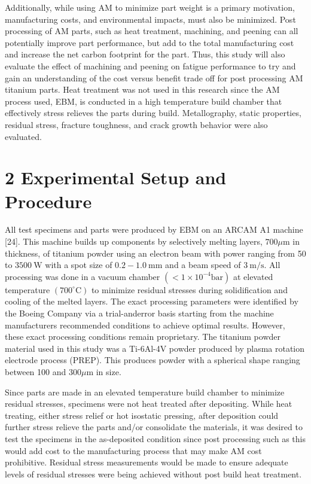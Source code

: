\documentclass[10pt]{article}
\begin{document}
Additionally, while using AM to minimize part weight is a primary motivation, manufacturing costs, and environmental impacts, must also be minimized. Post processing of AM parts, such as heat treatment, machining, and peening can all potentially improve part performance, but add to the total manufacturing cost and increase the net carbon footprint for the part. Thus, this study will also evaluate the effect of machining and peening on fatigue performance to try and gain an understanding of the cost versus benefit trade off for post processing AM titanium parts. Heat treatment was not used in this research since the AM process used, EBM, is conducted in a high temperature build chamber that effectively stress relieves the parts during build. Metallography, static properties, residual stress, fracture toughness, and crack growth behavior were also evaluated.

\section*{2 Experimental Setup and Procedure}
All test specimens and parts were produced by EBM on an ARCAM A1 machine [24]. This machine builds up components by selectively melting layers, $700 \mu \mathrm{m}$ in thickness, of titanium powder using an electron beam with power ranging from 50 to $3500 \mathrm{~W}$ with a spot size of $0.2-1.0 \mathrm{~mm}$ and a beam speed of $3 \mathrm{~m} / \mathrm{s}$. All processing was done in a vacuum chamber $\left(<1 \times 10^{-4} \mathrm{bar}\right)$ at elevated temperature $\left(700^{\circ} \mathrm{C}\right)$ to minimize residual stresses during solidification and cooling of the melted layers. The exact processing parameters were identified by the Boeing Company via a trial-anderror basis starting from the machine manufacturers recommended conditions to achieve optimal results. However, these exact processing conditions remain proprietary. The titanium powder material used in this study was a Ti-6Al-4V powder produced by plasma rotation electrode process (PREP). This produces powder with a spherical shape ranging between 100 and $300 \mu \mathrm{m}$ in size.

Since parts are made in an elevated temperature build chamber to minimize residual stresses, specimens were not heat treated after depositing. While heat treating, either stress relief or hot isostatic pressing, after deposition could further stress relieve the parts and/or consolidate the materials, it was desired to test the specimens in the as-deposited condition since post processing such as this would add cost to the manufacturing process that may make AM cost prohibitive. Residual stress measurements would be made to ensure adequate levels of residual stresses were being achieved without post build heat treatment.
\end{document}
